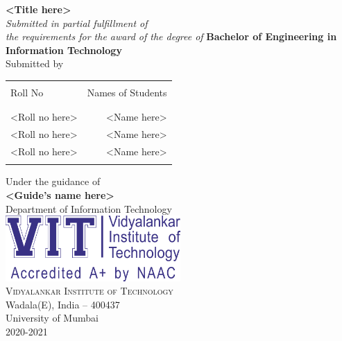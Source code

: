 \begin{titlepage}
       \begin{center}
              \Large \textbf {<Title here>}\\[0.5in]
              \small \emph{Submitted in partial fulfillment of\\
                     the requirements for the award of the degree of}
              \vspace{.2in}
              {\bf Bachelor of Engineering in Information Technology}\\[0.5in]

              \normalsize Submitted by \\
              \begin{table}[h]
                     \centering
                     \begin{tabular}{lr}\hline                         \\
                            Roll No        & Names of Students \\ \\ \hline
                            \\
                            <Roll no here> & <Name here>       \\
                            <Roll no here> & <Name here>       \\
                            <Roll no here> & <Name here>       \\ \\ \hline
                     \end{tabular}
              \end{table}
              \vspace{.2in}
              Under the guidance of\\
              {\textbf{<Guide's name here>}}\\[0.2in]

              \Large{Department of Information Technology}\\
              \vspace{.2in}
              \includegraphics[width=0.50\textwidth]{./vit-logo.png}\\[0.1in]
              \normalsize
              \textsc{Vidyalankar Institute of Technology}\\
              Wadala(E), India -- 400437\\
              \vspace{.4in}
              \large{University of Mumbai\\
                     2020-2021}
       \end{center}
\end{titlepage}
